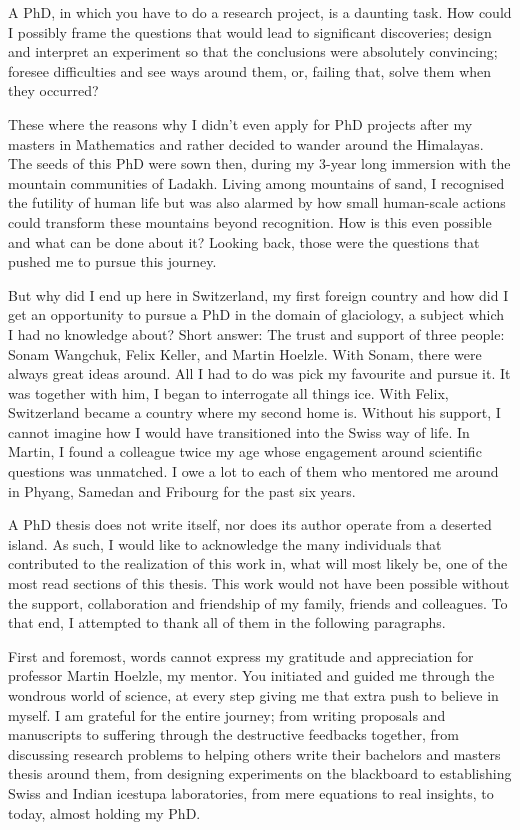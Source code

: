 %
\label{sec:acknowledgement}

A PhD, in which you have to do a research project, is a daunting task. How could I possibly frame the questions
that would lead to significant discoveries; design and interpret an experiment so that the conclusions were
absolutely convincing; foresee difficulties and see ways around them, or, failing that, solve them when they
occurred?

These where the reasons why I didn't even apply for PhD projects after my masters in Mathematics and rather decided
to wander around the Himalayas. The seeds of this PhD were sown then, during my 3-year long immersion with the
mountain communities of Ladakh. Living among mountains of sand, I recognised the futility of human life but was
also alarmed by how small human-scale actions could transform these mountains beyond recognition. How is this
even possible and what can be done about it? Looking back, those were the questions that pushed me to pursue
this journey. 

But why did I end up here in Switzerland, my first foreign country and how did I get an opportunity to pursue a
PhD in the domain of glaciology, a subject which I had no knowledge about? Short answer: The trust and support
of three people: Sonam Wangchuk, Felix Keller, and Martin Hoelzle. With Sonam, there were always great ideas
around. All I had to do was pick my favourite and pursue it. It was together with him, I began to interrogate
all things ice.  With Felix, Switzerland became a country where my second home is. Without his support, I cannot
imagine how I would have transitioned into the Swiss way of life. In Martin, I found a colleague twice my age
whose engagement around scientific questions was unmatched. I owe a lot to each of them who mentored me around
in Phyang, Samedan and Fribourg for the past six years.

A PhD thesis does not write itself, nor does its author operate from a deserted island. As such, I would like to
acknowledge the many individuals that contributed to the realization of this work in, what will most likely be,
one of the most read sections of this thesis. This work would not have been possible without the support,
collaboration and friendship of my family, friends and colleagues. To that end, I attempted to thank all of them
in the following paragraphs.

First and foremost, words cannot express my gratitude and appreciation for professor Martin Hoelzle, my mentor.
You initiated and guided me through the wondrous world of science, at every step giving me that extra push to
believe in myself. I am grateful for the entire journey; from writing proposals and manuscripts to suffering
through the destructive feedbacks together, from discussing research problems to helping others write their
bachelors and masters thesis around them, from designing experiments on the blackboard to establishing Swiss and
Indian icestupa laboratories, from mere equations to real insights, to today, almost holding my PhD.

